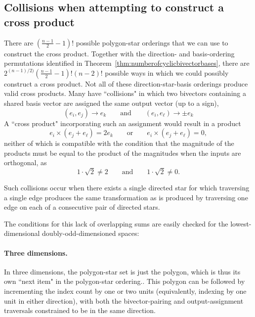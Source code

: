 \documentclass[11pt]{article}
\newcommand{\bv}[1][]{e_{#1}}
\newcommand{\bp}[2]{(#1,#2)}
\begin{document}
\subsection{Collisions when attempting to construct a cross product}
There are $ (\frac{n-1}{2} -1)! $ possible polygon-star orderings that we can use to construct the cross product. Together with the direction- and basis-ordering permutations identified in Theorem~\ref{thm:numberofcyclicbivectorbases}, there are $2^{(n-1)/2)} (\frac{n-1}{2} -1)!  (n-2)!$ possible ways in which we could possibly construct a cross product.
Not all of these  direction-star-basis orderings produce valid cross products. Many have ``collisions" in which two bivectors containing a shared basis vector are assigned the same output vector (up to a sign),
%
\begin{equation}
\bp{\bv[i]}{\bv[j]} \rightarrow \bv[k] \qquad \mathrm{and} \qquad \bp{\bv[i]}{\bv[\ell]} \rightarrow \pm\bv[k] 
\end{equation}
%
A ``cross product" incorporating such an assignment would result in a product
%
\begin{equation}
\bv[i] \times (\bv[j]+\bv[\ell]) = 2 \bv[k] \qquad \mathrm{or} \qquad \bv[i] \times (\bv[j]+\bv[\ell]) = 0,
\end{equation}
neither of which is compatible with the condition that the magnitude of the products must be equal to the product of the magnitudes when the inputs are orthogonal, as
\begin{equation} 
1 \cdot \sqrt{2} \neq 2 \qquad \mathrm{and} \qquad 1 \cdot \sqrt{2} \neq 0 .
\end{equation}


Such collisions occur when there exists a single directed star for which traversing a single edge produces the same transformation as is produced by traversing one edge on each of a consecutive pair of directed stars.

The conditions for this lack of overlapping sums are easily checked for the lowest-dimensional doubly-odd-dimensioned spaces:

\paragraph{Three dimensions.} In three dimensions, the polygon-star set is just the polygon, which is thus its own ``next item" in the polygon-star ordering.. This polygon can be followed by incrementing the index count by one or two units (equivalently, indexing by one unit in either direction), with both the bivector-pairing and output-assignment traversals constrained to be in the same direction. 
\end{document}
